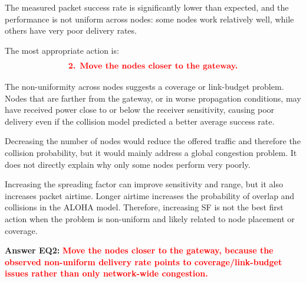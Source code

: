 \documentclass[a4paper,11pt]{article}
\newcommand{\answer}[1]{\textbf{\textcolor{red}{#1}}}
\begin{document}
The measured packet success rate is significantly lower than expected, and the
performance is not uniform across nodes: some nodes work relatively well, while
others have very poor delivery rates.

The most appropriate action is:
\[
  \answer{\text{2. Move the nodes closer to the gateway.}}
\]

The non-uniformity across nodes suggests a coverage or link-budget problem.
Nodes that are farther from the gateway, or in worse propagation conditions,
may have received power close to or below the receiver sensitivity, causing poor
delivery even if the collision model predicted a better average success rate.

Decreasing the number of nodes would reduce the offered traffic and therefore
the collision probability, but it would mainly address a global congestion
problem. It does not directly explain why only some nodes perform very poorly.

Increasing the spreading factor can improve sensitivity and range, but it also
increases packet airtime. Longer airtime increases the probability of overlap
and collisions in the ALOHA model. Therefore, increasing SF is not the best
first action when the problem is non-uniform and likely related to node
placement or coverage.

\textbf{Answer EQ2:} \answer{Move the nodes closer to the gateway, because the observed non-uniform delivery rate points to coverage/link-budget issues rather than only network-wide congestion.}
\end{document}

